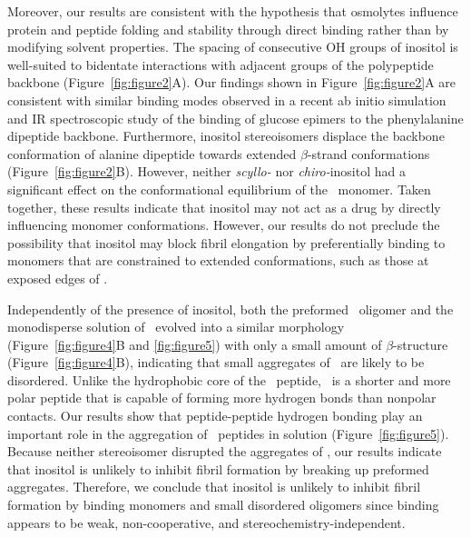 Moreover, our results are consistent with the hypothesis that osmolytes influence protein and peptide folding and stability through direct binding rather than by modifying solvent properties.\cite{Canchi:2011p53,Lee:2010p59,Street:2006p21} The spacing of consecutive OH groups of inositol is well-suited to bidentate interactions with adjacent groups of the polypeptide backbone (Figure~\ref{fig:figure2}A). Our findings shown in Figure~\ref{fig:figure2}A are consistent with similar binding modes observed in a recent ab initio simulation and IR spectroscopic study of the binding of glucose epimers to the phenylalanine dipeptide backbone.\cite{Cocinero:2011p54} Furthermore, inositol stereoisomers displace the backbone conformation of alanine dipeptide towards extended $\beta$-strand conformations (Figure~\ref{fig:figure2}B). However, neither \textit{scyllo-} nor \textit{chiro-}inositol had a significant effect on the conformational equilibrium of the \gafour\ monomer. Taken together, these results indicate that inositol may not act as a drug by directly influencing monomer conformations. However, our results do not preclude the possibility that inositol may block fibril elongation by preferentially binding to monomers that are constrained to extended conformations, such as those at exposed edges of \bsheets.

Independently of the presence of inositol, both the preformed \bsheet\ oligomer and the monodisperse solution of \gafour\ evolved into a similar morphology (Figure~\ref{fig:figure4}B and \ref{fig:figure5}) with only a small amount of $\beta$-structure (Figure~\ref{fig:figure4}B), indicating that small aggregates of \gafour\ are likely to be disordered. Unlike the hydrophobic core of the \abeta\ peptide, \gafour\ is a shorter and more polar peptide that is capable of forming more hydrogen bonds than nonpolar contacts. Our results show that peptide-peptide hydrogen bonding play an important role in the aggregation of \gafour\ peptides in solution (Figure~\ref{fig:figure5}). Because neither stereoisomer disrupted the aggregates of \gafour, our results indicate that inositol is unlikely to inhibit fibril formation by breaking up preformed aggregates. Therefore, we conclude that inositol is unlikely to inhibit fibril formation by binding monomers and small disordered oligomers since binding appears to be weak, non-cooperative, and stereochemistry-independent.

